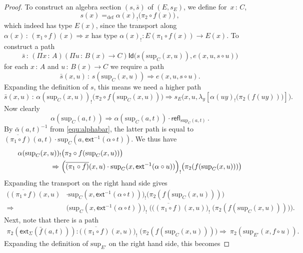 \documentclass[10pt,a4paper,oneside,reqno]{amsart}
\theoremstyle{mythm}
\theoremstyle{mydef}
\theoremstyle{myrmk}
\newcommand{\defeq}{=_{\mathrm{def}}}
\newcommand{\co}{\,{:}\,}
\newcommand{\com}{\circ}
\newcommand{\ct}{\cdot}
\newcommand{\ext}{\mathsf{ext}}
\newcommand{\Id}{\mathsf{Id}}
\newcommand{\refl}{\mathsf{refl}}
\newcommand{\lam}[1]{\lambda_{#1}}
\renewcommand{\sup}{\mathrm{sup}}
\begin{document}
\begin{proof}
To construct an algebra section $(s, \bar{s})$ of $(E, s_E)$, we define for~$x \co C$, 
\begin{equation}
\label{equ:defreqsection}
s(x) \defeq \alpha(x)_{!} \big( \pi_2 \com f (x) \big) \, ,
\end{equation}
which indeed has type $E(x)$, since the transport along $\alpha(x) \co (\pi_1 \circ f)(x) \Rightarrow x$ has type $\alpha(x)_{!} : E(\pi_1 \com f (x)) \to E(x)$.
%
To construct a path 
\[
\bar{s} \co (\Pi x  \co A) (\Pi u  \co B(x) \to C) \Id \big( s(\sup_C(x,u)), e(x, u, s \circ u) \big)
\]
for each $x \co A$ and $u \co B(x)\to C$ we require a path
\[
\bar{s}(x,u) \co s(\sup_C(x,u)) \Rightarrow e(x, u, s \circ u).
\] 
Expanding the definition of $s$, this means we need a higher path
\begin{equation}\label{eq:proof:thm:WMain:needpath}
\bar{s}(x,u) \co \alpha(\sup_C(x,u))_{!} \big( \pi_2 \com f (\sup_C(x,u)) \big) \Rightarrow 
s_E\big(x, u, \lam{y}[\alpha(u y)_{!} \big( \pi_2 (f(u y))\big)]\big).
\end{equation}
Now clearly 
\[
\alpha(\sup_C(a,t)) \Rightarrow \alpha(\sup_C(a,t)) \ct \refl_{\sup_C(a,t)} \, .
\]
By $\bar{\alpha}(a,t)^{-1}$ from \eqref{equ:alphabar}, the latter path is equal to $\overline{(\pi_1 \com f)}(a,t) \ct \sup_C(a,\ext^{-1}(\alpha \circ t))$. 
We thus have
\begin{align}
\alpha(\sup_C(x,u))_{!}& \big( \pi_2 \com f (\sup_C(x,u)) \big) \notag \\
 \Rightarrow\ &
 \Big(\overline{(\pi_1 \com f)}(x,u) \ct \sup_C(x,\ext^{-1}(\alpha \circ u))\Big)_{!} \big( \pi_2 (f (\sup_C(x,u))) \big) \label{eqnstart}
\end{align}
Expanding the transport on the right hand side gives
\begin{align*}
\Big(\overline{(\pi_1 \com f)}(x,u)& \ct \sup_C(x,\ext^{-1}(\alpha \circ t))\Big)_{!} \big( \pi_2 (f (\sup_C(x,u))) \big) \\
\Rightarrow &\big(\sup_C(x,\ext^{-1}(\alpha \circ t))\big)_{!} \; \Big( \big(\overline{(\pi_1 \com f)}(x,u)\big)_{!} \; 
\big(\pi_2 (f (\sup_C(x,u))) \big) \Big).
\end{align*}
%
Next, note that there is a path 
\begin{align*}
\pi_2(\ext_\Sigma(\bar{f}(a,t))) : \big(\overline{(\pi_1 \com f)}(x,u)\big)_{!} \; \big(\pi_2(f (\sup_C(x,u))) \big)
\Rightarrow\ \pi_2(\sup_{E'}(x, f \circ u)).
\end{align*}
Expanding the definition of $\sup_{E'}$ on the right hand side, this becomes

\end{proof}
\end{document}
